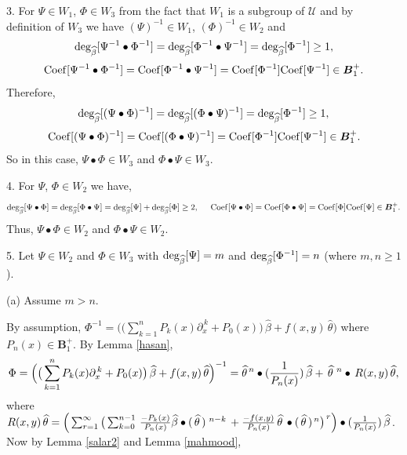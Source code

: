 \documentclass[10pt]{article}
\newcommand{\be}{\begin{equation}}
\newcommand{\ee}{\end{equation}}
\newcommand{\nn}{\nonumber}
\newcommand{\rd}{\partial}
\newcommand{\PP}{\boldsymbol{B}^{+}_1}
\newcommand{\Deg}{\rm deg_{\widehat{\beta}}}
\begin{document}
{{\begin{itemize}
{\item[]{3.\hspace{0.5cm}  For $\Psi \in W_1$, $\Phi\in W_3$ from the
 fact that $W_1$ is a subgroup of $\mathcal U$ and by definition of $W_3$ we have $(\Psi)^{-1} \in W_1$, $(\Phi)^{-1}\in W_2$ and  \be {\rm
deg_{\widehat{\beta}}}[\Psi^{-1}\bullet\Phi^{-1}]= {\rm
deg_{\widehat{\beta}}}[\Phi^{-1}\bullet\Psi^{-1}]= {\rm
deg_{\widehat{\beta}}}[\Phi^{-1}]\geq  1,\nn\ee \be {\rm
Coef}[\Psi^{-1}\bullet\Phi^{-1}]=
 {\rm Coef}[\Phi^{-1}\bullet\Psi^{-1}]=  {\rm Coef}[\Phi^{-1}] {\rm Coef}[\Psi^{-1}]\in \PP.\nn\ee
Therefore, \be {\rm deg_{\widehat{\beta}}}[(\Psi\bullet\Phi)^{-1}]=
{\rm deg_{\widehat{\beta}}}[(\Phi\bullet\Psi)^{-1}]= {\rm
deg_{\widehat{\beta}}}[\Phi^{-1}]\geq  1,\nn\ee \be {\rm
Coef}[(\Psi\bullet\Phi)^{-1}]=
 {\rm Coef}[(\Phi\bullet\Psi)^{-1}]=  {\rm Coef}[\Phi^{-1}] {\rm Coef}[\Psi^{-1}]\in\PP.\nn\ee
So in this case, $ \Psi\bullet\Phi\in W_3$ and $\Phi\bullet\Psi \in
 W_3$.}\\

\item[]{4.\hspace{0.5cm}  For $\Psi$, $\Phi\in W_2$ we have,  \be {\Deg} [\Psi\bullet\Phi]=
{\rm deg_{\widehat{\beta}}}[\Phi\bullet\Psi]= {\rm
deg_{\widehat{\beta}}}[\Psi]+ {\Deg}[\Phi]\geq 2, \hspace{0.5cm}
{\rm Coef}[\Psi\bullet\Phi]=
 {\rm Coef}[\Phi\bullet\Psi]=  {\rm Coef}[\Phi] {\rm Coef}[\Psi]\in\PP.\nn\ee Thus, $ \Psi\bullet\Phi \in W_2$ and
$\Phi\bullet\Psi \in
 W_2$.\\

\item[]5.\hspace{0.5cm}  Let $\Psi \in W_2$ and $\Phi\in W_3$ with ${\Deg}[\Psi]=m$ and
${\Deg}[\Phi^{-1}]= n$  (where $m,n\geq1$).

(a) Assume $m>n$.

By assumption, $\Phi^{-1}=\Big(\big(\sum^{n}_{k=1} P_{k}(x)
\rd_{x}^{\,k}+P_{0}(x)\big)\,\widehat{\beta}+
 f(x,y)\,\widehat{\theta}\Big)$ where $P_{n}(x)\in\PP$. By Lemma \ref{hasan},
\be\Phi=\Big(\big(\sum^{n}_{k=1} P_{k}(x)
\rd_{x}^{\,k}+P_{0}(x)\big)\,\widehat{\beta}+
 f(x,y)\,\widehat{\theta}\Big)^{-1}=\widehat{\theta}^{\,
n}\bullet({1\over
P_{n}(x)})\,\widehat{\beta}+\,\widehat{\theta}\,^{\,
n}\bullet\,R(x,y)\,\widehat{\theta},\nn\ee where $
R(x,y)\,\widehat{\theta}=\Big(\sum_{r=1}^{\infty}\big(\sum_{k=0}^{n-1}
\,{-P_{k}(x)\over
P_{n}(x)}\widehat{\beta}\bullet(\,\widehat{\theta}\,)^{\,\,
{n-k}}\,+{-f(x,y)\over
P_{n}(x)}\,\widehat{\theta}\,\bullet(\,\widehat{\theta}\,)^{\,n}
\big)^{\,r}\Big)\bullet ({1\over P_{n}(x)})\,\widehat{\beta}$. Now
by Lemma \ref{salar2} and Lemma \ref{mahmood},

}}
\end{itemize}}}
\end{document}
